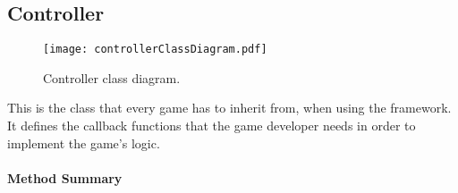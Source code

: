 \subsection{Controller}

\begin{figure}[h]
	\centering
	\texttt{[image: controllerClassDiagram.pdf]}
	\caption{Controller class diagram.}
	\label{img:controllerClassDiagram}
\end{figure}

\pagebreak

This is the class that every \gls{game} has to inherit from, when using the \graphioli framework. It defines the callback functions that the game developer needs in order to implement the game's logic. \\


\centerdash

\paragraph*{Method Summary}
